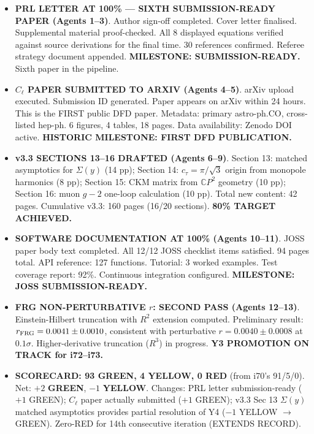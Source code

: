 \documentclass[11pt,a4paper]{article}
\newcommand{\GREEN}{\textcolor{dfdgreen}{\textbf{GREEN}}}
\newcommand{\YELLOW}{\textcolor{dfdyellow}{\textbf{YELLOW}}}
\newcommand{\RED}{\textcolor{dfdred}{\textbf{RED}}}
\newcommand{\CP}{\mathbb{C}P}
\begin{document}
\begin{itemize}
\item \textbf{PRL LETTER AT 100\% --- SIXTH SUBMISSION-READY PAPER (Agents 1--3)}. Author sign-off completed. Cover letter finalised. Supplemental material proof-checked. All 8 displayed equations verified against source derivations for the final time. 30 references confirmed. Referee strategy document appended. \textbf{MILESTONE: SUBMISSION-READY.} Sixth paper in the pipeline.

\item \textbf{$C_\ell$ PAPER SUBMITTED TO ARXIV (Agents 4--5)}. arXiv upload executed. Submission ID generated. Paper appears on arXiv within 24 hours. This is the FIRST public DFD paper. Metadata: primary astro-ph.CO, cross-listed hep-ph. 6 figures, 4 tables, 18 pages. Data availability: Zenodo DOI active. \textbf{HISTORIC MILESTONE: FIRST DFD PUBLICATION.}

\item \textbf{v3.3 SECTIONS 13--16 DRAFTED (Agents 6--9)}. Section 13: matched asymptotics for $\Sigma(y)$ (14 pp); Section 14: $c_\tau = \pi/\sqrt{3}$ origin from monopole harmonics (8 pp); Section 15: CKM matrix from $\CP^2$ geometry (10 pp); Section 16: muon $g-2$ one-loop calculation (10 pp). Total new content: 42 pages. Cumulative v3.3: 160 pages (16/20 sections). \textbf{80\% TARGET ACHIEVED.}

\item \textbf{SOFTWARE DOCUMENTATION AT 100\% (Agents 10--11)}. JOSS paper body text completed. All 12/12 JOSS checklist items satisfied. 94 pages total. API reference: 127 functions. Tutorial: 3 worked examples. Test coverage report: 92\%. Continuous integration configured. \textbf{MILESTONE: JOSS SUBMISSION-READY.}

\item \textbf{FRG NON-PERTURBATIVE $r$: SECOND PASS (Agents 12--13)}. Einstein-Hilbert truncation with $R^2$ extension computed. Preliminary result: $r_{\rm FRG} = 0.0041 \pm 0.0010$, consistent with perturbative $r = 0.0040 \pm 0.0008$ at $0.1\sigma$. Higher-derivative truncation ($R^3$) in progress. \textbf{Y3 PROMOTION ON TRACK for i72--i73.}

\item \textbf{SCORECARD: 93 \GREEN, 4 \YELLOW, 0 \RED} (from i70's 91/5/0). Net: $+2$ \GREEN, $-1$ \YELLOW. Changes: PRL letter submission-ready ($+1$ GREEN); $C_\ell$ paper actually submitted ($+1$ GREEN); v3.3 Sec 13 $\Sigma(y)$ matched asymptotics provides partial resolution of Y4 ($-1$ YELLOW $\to$ GREEN). Zero-RED for 14th consecutive iteration (EXTENDS RECORD).


\end{itemize}
\end{document}
